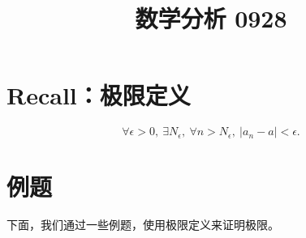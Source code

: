 \documentclass[UTF8,11pt]{ctexart}
\title{数学分析 0928}
\date{}
\theoremstyle{cnthm}
\begin{document}
\maketitle

\section{Recall：极限定义}

\[
\forall\epsilon>0,\ \exists N_\epsilon,\ \forall n>N_\epsilon,\
|a_n-a|<\epsilon .
\]

\section{例题}

下面，我们通过一些例题，使用极限定义来证明极限。
\end{document}
